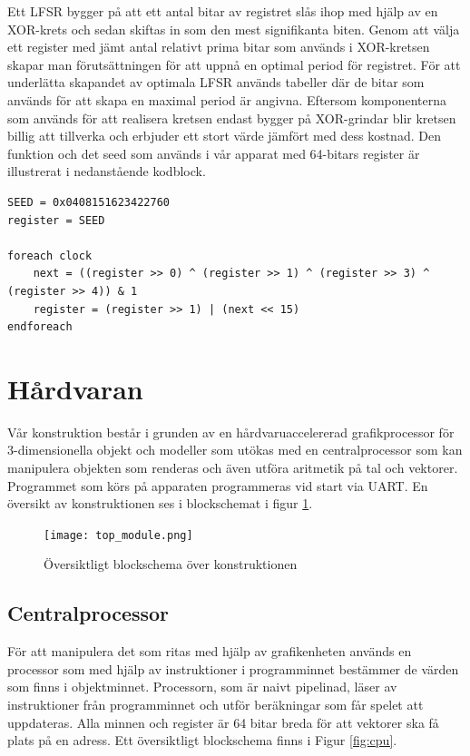 \documentclass[a4paper]{article}
\begin{document}
    Ett LFSR bygger på att ett antal bitar av registret slås ihop med hjälp av en XOR-krets och
    sedan skiftas in som den mest signifikanta biten. Genom att välja ett register med jämt antal 
    relativt prima bitar som används i XOR-kretsen skapar man förutsättningen för att uppnå en
    optimal period för registret. För att underlätta skapandet av optimala LFSR används tabeller
    där de bitar som används för att skapa en maximal period är angivna. Eftersom komponenterna som
    används för att realisera kretsen endast bygger på XOR-grindar blir kretsen billig att tillverka
    och erbjuder ett stort värde jämfört med dess kostnad. Den funktion och det seed som används i
    vår apparat med 64-bitars register är illustrerat i nedanstående kodblock.

    \begin{lstlisting}[]
SEED = 0x0408151623422760
register = SEED

foreach clock
    next = ((register >> 0) ^ (register >> 1) ^ (register >> 3) ^ (register >> 4)) & 1
    register = (register >> 1) | (next << 15)
endforeach
    \end{lstlisting}

\section{Hårdvaran}

    Vår konstruktion består i grunden av en hårdvaruaccelererad grafikprocessor
    	för 3-dimensionella objekt och modeller som utökas med en centralprocessor
    som kan manipulera objekten som renderas och även utföra aritmetik på tal
    och vektorer. Programmet som körs på apparaten programmeras vid start via
    UART. En översikt av konstruktionen ses i blockschemat i figur
    \ref{fig:top_module}. 

    \begin{figure}[H]
        \centering
        \texttt{[image: top\_module.png]}
        \caption{Översiktligt blockschema över  konstruktionen}
        \label{fig:top_module}
    \end{figure}
    
    \subsection{Centralprocessor}
	För att manipulera det som ritas med hjälp av grafikenheten används en processor 
	som med hjälp av instruktioner i programminnet bestämmer de värden som finns i 
	objektminnet. Processorn, som är naivt pipelinad, läser av instruktioner från 
	programminnet och utför beräkningar som får spelet att uppdateras. Alla minnen 
	och register är 64 bitar breda för att vektorer ska få plats på en adress. 
	Ett översiktligt blockschema finns i Figur \ref{fig:cpu}.
\end{document}
